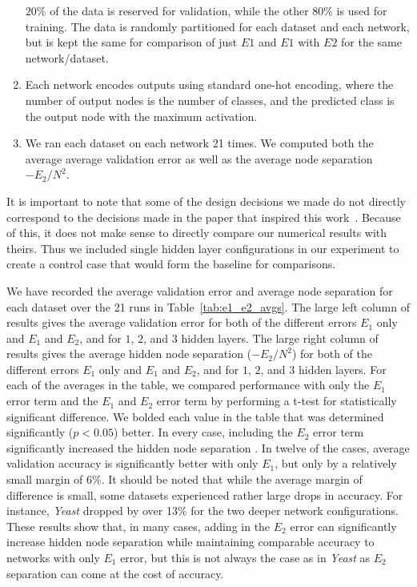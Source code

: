 \begin{enumerate}
  $20\%$ of the data is reserved for validation, while the other $80\%$ is
  used for training. The data is randomly partitioned for each dataset and
  each network, but is kept the same for comparison of just $E1$ and $E1$
  with $E2$ for the same network/dataset.
\item
  Each network encodes outputs using standard one-hot encoding, where the number
  of output nodes is the number of classes, and the predicted class is the
  output node with the maximum activation.
\item
  We ran each dataset on each network 21 times. We computed both the average
  average validation error as well as the average node separation
  $-E_2/N^2$.
\end{enumerate}

It is important to note that some of the design decisions we
made do not directly correspond to the decisions made in the paper
that inspired this work~\cite{thuan11}. Because of this, it does not
make sense to directly compare our numerical results with theirs.
Thus we included single hidden layer
configurations in our experiment to create a control case that would
form the baseline for comparisons. 

We have recorded the average validation error and average node separation
for each dataset over the 21 runs in Table~\ref{tab:e1_e2_avgs}.
The large left column of results
gives the average validation error for both of the different errors
$E_1$ only and $E_1$ and $E_2$, and for $1$, $2$, and $3$ hidden layers.
The large right column of results
gives the average hidden node separation ($-E_2/N^{2}$)
for both of the different errors
$E_1$ only and $E_1$ and $E_2$, and for $1$, $2$, and $3$ hidden layers.
For each of the averages in the table, we compared performance with only the
$E_1$ error term and the $E_1$ and $E_2$ error term by performing a t-test
for statistically significant difference. We bolded each value in the table
that was determined significantly ($p < 0.05$) better.
In every case, including the $E_2$ error term
significantly increased the hidden node separation .
In twelve of the cases, average validation accuracy is significantly
better with only $E_1$, but only by a relatively small margin of
6\%. It should be noted that while the average margin of difference is
small, some datasets experienced rather large drops in accuracy. For instance,
\textit{Yeast} dropped by over 13\% for the two deeper network configurations.
These results show that, in many cases, adding in the $E_2$ error can
significantly increase hidden node separation while maintaining comparable
accuracy to networks with only $E_1$  error, but this is not always the
case as in \textit{Yeast} as $E_2$ separation can come at the cost of
accuracy.

